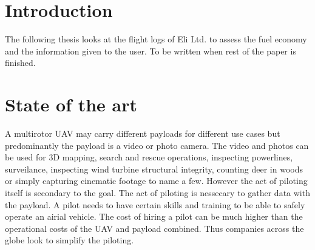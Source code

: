 \documentclass[12pt,oneside]{reedthesis}
\theoremstyle{definition}
\theoremstyle{definition}
\theoremstyle{definition}
\theoremstyle{remark}
\begin{document}
  \hypersetup{linkcolor=black}
  \setcounter{tocdepth}{2}
  \tableofcontents

  \listoffigures

  \listoftables

\mainmatter %
\pagestyle{fancyplain} %

\chapter*{Introduction}\label{introduction}

The following thesis looks at the flight logs of Eli Ltd. to assess the
fuel economy and the information given to the user. To be written when
rest of the paper is finished.

\chapter{State of the art}\label{state}

A multirotor UAV may carry different payloads for different use cases
but predominantly the payload is a video or photo camera. The video and
photos can be used for 3D mapping, search and rescue operations,
inspecting powerlines, surveilance, inspecting wind turbine structural
integrity, counting deer in woods or simply capturing cinematic footage
to name a few. However the act of piloting itself is secondary to the
goal. The act of piloting is nessecary to gather data with the payload.
A pilot needs to have certain skills and training to be able to safely
operate an airial vehicle. The cost of hiring a pilot can be much higher
than the operational costs of the UAV and payload combined. Thus
companies across the globe look to simplify the piloting.
\end{document}
